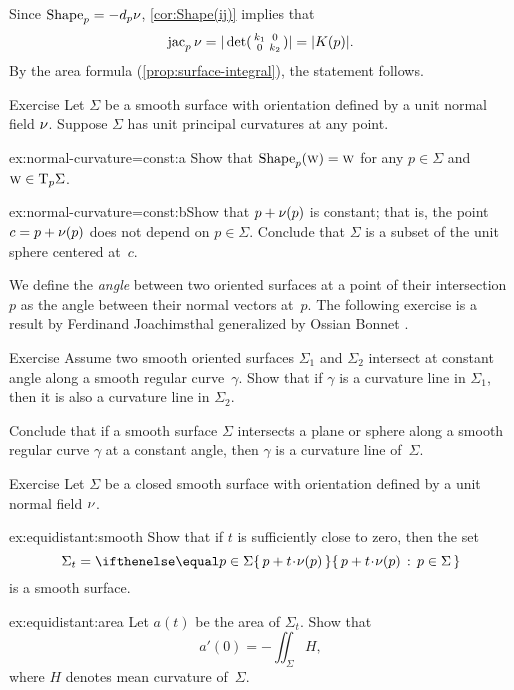 Since $\mathop{\rm Shape}\nolimits_p=-d_p\nu$, \ref{cor:Shape(ij)} implies that
\[\mathop{\rm jac}\nolimits_p\nu=|\det(\begin{smallmatrix}
 k_1
 &0
 \\
 0
 &k_2
 \end{smallmatrix})|=|K(p)|.\]
By the area formula (\ref{prop:surface-integral}), the statement follows.
\qeds


\begin{thm}{Exercise}\label{ex:normal-curvature=const}
Let $\Sigma$ be a smooth surface with orientation defined by a unit normal field $\nu$.
Suppose $\Sigma$ has unit principal curvatures at any point.

\begin{subthm}{ex:normal-curvature=const:a} Show that $\mathop{\rm Shape}\nolimits_p(\text{\sc{w}})=\text{\sc{w}}$ for any $p\in\Sigma$ and $\text{\sc{w}}\in \mathrm{T}_p\Sigma$.
\end{subthm}

\begin{subthm}{ex:normal-curvature=const:b}Show that $p+\nu(p)$ is constant; that is, the point $c=p+\nu(p)$ does not depend on $p\in\Sigma$.
Conclude that $\Sigma$ is a subset of the unit sphere centered at~$c$.
\end{subthm}

\end{thm}

We define the {}\emph{angle} between two oriented surfaces at a point of their intersection $p$ as the angle between their normal vectors at~$p$.
The following exercise is a result by Ferdinand Joachimsthal \cite{joachimsthal} generalized by Ossian Bonnet \cite{bonnet}.

\begin{thm}{Exercise}\label{ex:shape-curvature-line}
Assume two smooth oriented surfaces $\Sigma_1$ and $\Sigma_2$ intersect at constant angle along a smooth regular curve~$\gamma$.
Show that if $\gamma$ is a curvature line in $\Sigma_1$, then it is also a curvature line in $\Sigma_2$.

Conclude that if a smooth surface $\Sigma$ intersects a plane or sphere along a smooth regular curve $\gamma$ at a constant angle,
then $\gamma$ is a curvature line of~$\Sigma$.
\end{thm}

\begin{thm}{Exercise}\label{ex:equidistant}
Let $\Sigma$ be a closed smooth surface with orientation defined by a unit normal field $\nu$.

\begin{subthm}{ex:equidistant:smooth}
Show that if $t$ is sufficiently close to zero, then the set 
\[\Sigma_t=\set{p+t\cdot \Norm(p)}{p\in\Sigma}\] 
is a smooth surface.
\end{subthm}

\begin{subthm}{ex:equidistant:area}
Let $a(t)$ be the area of $\Sigma_t$.
Show that 
\[a'(0)=-\iint_\Sigma H,\]
where $H$ denotes mean curvature of~$\Sigma$.
\end{subthm}



\end{thm}

